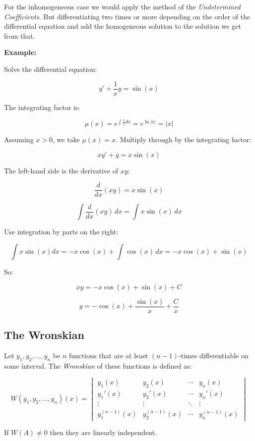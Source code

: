 For the inhomogeneous case we would apply the method of the \emph{Undetermined Coefficients}. But 
differentiating two times or more depending on the order of the differential equation and add the 
homogeneous solution to the solution we get from that.

\textbf{Example:}

Solve the differential equation:

\[
    y' + \frac{1}{x} y = \sin(x)
\]

The integrating factor is:

\[
    \mu(x) = e^{\int \frac{1}{x} dx} = e^{\ln|x|} = |x|
\]

Assuming \( x > 0 \), we take \( \mu(x) = x \). Multiply through by the integrating factor:

\[
    x y' + y = x \sin(x)
\]

The left-hand side is the derivative of \( x y \):

\[
    \frac{d}{dx}(x y) = x \sin(x)
\]

\[
    \int \frac{d}{dx}(x y) \, dx = \int x \sin(x)\, dx
\]

Use integration by parts on the right:

\[
    \int x \sin(x) dx = -x \cos(x) + \int \cos(x) \, dx = -x \cos(x) + \sin(x)
\]

So:

\[
    x y = -x \cos(x) + \sin(x) + C
\]

\[
    y = -\cos(x) + \frac{\sin(x)}{x} + \frac{C}{x}
\]

\subsection{The Wronskian}

Let \( y_1, y_2, \ldots, y_n \) be \(n\) functions that are at least 
\( (n-1) \)-times differentiable on some interval. The \emph{Wronskian} of these 
functions is defined as:

\[
    W(y_1, y_2, \ldots, y_n)(x) =
    \begin{vmatrix}
    y_1(x) & y_2(x) & \cdots & y_n(x) \\
    y_1'(x) & y_2'(x) & \cdots & y_n'(x) \\
    \vdots & \vdots & \ddots & \vdots \\
    y_1^{(n-1)}(x) & y_2^{(n-1)}(x) & \cdots & y_n^{(n-1)}(x)
    \end{vmatrix}
\]

If \(W(A) \ne 0\) then they are linearly independent.

